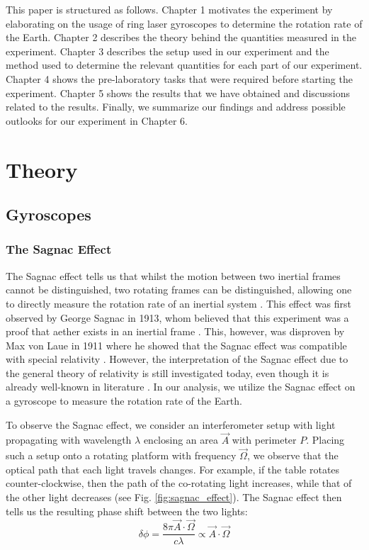 \documentclass[a4paper]{report}
\numberwithin{equation}{section}
\begin{document}
This paper is structured as follows. Chapter 1 motivates the experiment by elaborating on the usage of ring laser gyroscopes
to determine the rotation rate of the Earth. Chapter 2 describes the theory behind the quantities measured in the experiment. Chapter 3
describes the setup used in our experiment and the method used to determine the relevant quantities for each part of our experiment. 
Chapter 4 shows the pre-laboratory tasks that were required before starting the experiment. Chapter 5 shows the results
that we have obtained and discussions related to the results. Finally, we summarize our findings and address possible outlooks for our experiment
in Chapter 6. 



\chapter{Theory}

\section{Gyroscopes}

\subsection{The Sagnac Effect}

The Sagnac effect tells us that whilst the motion between two inertial frames cannot be distinguished, two rotating frames can be 
distinguished, allowing one to directly measure the rotation rate of an inertial system \cite{Groh2021}. This effect was first observed by 
George Sagnac in 1913, whom believed that this experiment was a proof that aether exists in an inertial frame  \cite{Darrigol2014}. This, however, was 
disproven by Max von Laue in 1911 where he showed that the Sagnac effect was compatible with special relativity \cite{Laue1911}. 
However, the interpretation of the Sagnac effect due to the general theory of relativity is still investigated today, 
even though it is already well-known in literature \cite{Benedetto2019}. In our analysis, we utilize the Sagnac effect on a gyroscope to 
measure the rotation rate of the Earth.\par

To observe the Sagnac effect, we consider an interferometer setup with light propagating with wavelength $\lambda$ enclosing an area $\vec{A}$
 with perimeter $P$. Placing such a setup onto a rotating platform with frequency $\vec{\Omega}$, we observe that the optical path that
 each light travels changes. For example, if the table rotates counter-clockwise, then the path of the co-rotating light increases, while that of the other light
decreases (see Fig. \ref{fig:sagnac_effect}). The Sagnac effect then tells us the resulting phase shift between the two lights:
\begin{equation}
	\delta \phi = \frac{8\pi \vec{A} \cdot \vec{\Omega}}{c \lambda} \propto \vec{A} \cdot \vec{\Omega}
\end{equation} 
\end{document}

